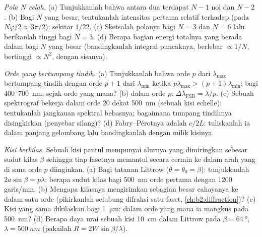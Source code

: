 \begin{exercise}[$\star\star$]\label{exo:b2:gratings:5}
\emph{Pola $N$ celah.} (a) Tunjukkanlah bahwa antara dua 
terdapat $N - 1$ nol dan $N - 2$ . (b) Bagi $N$ yang besar,
tentukanlah intensitas  pertama relatif terhadap  (pada $N\varphi/2 \approx 3\pi/2$): sekitar $1/22$. (c) Sketsalah polanya bagi
$N = 3$ dan $N = 6$ lalu berikanlah tinggi  bagi
$N = 3$. (d) Berapa bagian energi totalnya yang berada dalam  bagi
$N$ yang besar (bandingkanlah integral puncaknya, berlebar $\propto 1/N$, bertinggi
$\propto N^2$, dengan sisanya).
\end{exercise}

\begin{exercise}[$\star\star$]\label{exo:b2:gratings:6}
\emph{Orde yang bertumpang tindih.} (a) Tunjukkanlah bahwa orde $p$ dari $\lambda_{\max}$ bertumpang tindih dengan
orde $p + 1$ dari $\lambda_{\min}$ ketika $p\lambda_{\max} > (p + 1)\lambda_{\min}$; bagi $400$--\qty{700}{nm},
sejak orde yang mana? (b)  dalam orde $p$: $\Delta\lambda_{\text{FSR}}
= \lambda/p$. (c) Sebuah spektrograf bekerja dalam orde $20$ dekat \qty{500}{nm} (sebuah
kisi echelle): tentukanlah jangkauan spektral bebasnya; bagaimana tumpang tindihnya disingkirkan
(penyebar silang)? (d)  Fabry--Pérotnya adalah $c/2L$:
tuliskanlah ia dalam panjang gelombang lalu bandingkanlah dengan milik kisinya.
\end{exercise}

\begin{exercise}[$\star\star$]\label{exo:b2:gratings:7}
\emph{Kisi berkilas.} Sebuah kisi pantul mempunyai alurnya yang dimiringkan sebesar
sudut kilas $\beta$ sehingga tiap fasetnya memantul secara cermin ke dalam
arah yang di sana orde $p$ diinginkan. (a) Bagi tatanan Littrow
($\theta = \theta_0 = \beta$): tunjukkanlah $2a\sin\beta = p\lambda$; berapa sudut kilas bagi
\qty{500}{nm} orde pertama dengan $1200$ garis/mm. (b) Mengapa kilasnya mengirimkan sebagian besar
cahayanya ke dalam satu orde (pikirkanlah selubung difraksi satu
faset, \cref{ch:b2:diffraction})? (c) Kisi yang sama dikilaskan
bagi \qty{1}{\micro m}: dalam orde yang mana ia mangkus pada \qty{500}{nm}? (d)
Berapa daya urai sebuah kisi \qty{10}{cm} dalam Littrow pada $\beta = \qty{64}{\degree}$,
$\lambda = \qty{500}{nm}$ (pakailah $R = 2W\sin\beta/\lambda$).
\end{exercise}


